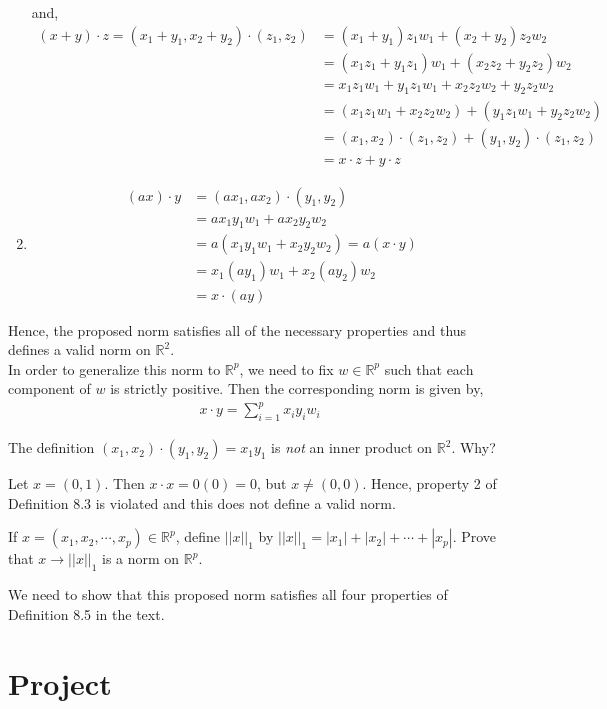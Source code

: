 \documentclass[12pt]{article}
\newenvironment{problem}[2][Problem]{\begin{trivlist}
\item[\hskip \labelsep {\bfseries #1}\hskip \labelsep {\bfseries #2.}]}{\end{trivlist}}
\begin{document}
\begin{enumerate}
and, 
\begin{align*}
(x + y) \cdot z = (x_1 + y_1, x_2 + y_2) \cdot (z_1, z_2) &= (x_1 + y_1)z_1w_1 + (x_2 + y_2)z_2w_2\\
&= (x_1z_1 + y_1z_1)w_1 + (x_2z_2 + y_2z_2)w_2\\
&= x_1z_1w_1 + y_1z_1w_1 + x_2z_2w_2 + y_2z_2w_2\\
&= (x_1z_1w_1 + x_2z_2w_2) + (y_1z_1w_1 + y_2z_2w_2)\\
&= (x_1, x_2) \cdot (z_1, z_2) + (y_1, y_2) \cdot (z_1, z_2)\\
&= x \cdot z + y \cdot z
\end{align*}

\item \begin{align*}
(ax) \cdot y &= (ax_1, ax_2) \cdot (y_1, y_2)\\
&= ax_1y_1w_1 + ax_2y_2w_2\\
&= a(x_1y_1w_1 + x_2y_2w_2) = a(x \cdot y)\\
&= x_1(ay_1)w_1 + x_2(ay_2)w_2\\
&= x \cdot (ay)
\end{align*}
\end{enumerate}

Hence, the proposed norm satisfies all of the necessary properties and thus defines a valid norm on $\mathbb{R}^2$.\\

In order to generalize this norm to $\mathbb{R}^p$, we need to fix $w \in \mathbb{R}^p$ such that each component of $w$ is strictly positive. Then the corresponding norm is given by,
\begin{align*}
x \cdot y = \sum_{i=1}^p x_iy_iw_i
\end{align*}

\begin{problem}{8.E} The definition $(x_1, x_2) \cdot (y_1, y_2) = x_1y_1$ is \textit{not} an inner product on $\mathbb{R}^2$. Why?
\end{problem}

Let $x = (0, 1)$. Then $x \cdot x = 0(0) = 0$, but $x \neq (0, 0)$. Hence, property 2 of Definition 8.3 is violated and this does not define a valid norm.

\begin{problem}{8.F} If $x = (x_1, x_2, \cdots, x_p) \in \mathbb{R}^p$, define $||x||_1$ by $||x||_1 = |x_1| + |x_2| + \cdots + |x_p|$. Prove that $x \to ||x||_1$ is a norm on $\mathbb{R}^p$.
\end{problem}

We need to show that this proposed norm satisfies all four properties of Definition 8.5 in the text.

\section{Project}
\end{document}
